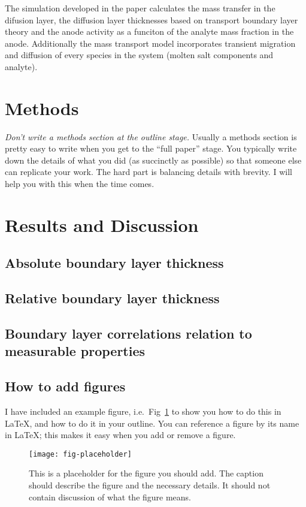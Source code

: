 \documentclass[journal=mamobx, layout=twocolumn]{achemso}
\begin{document}
The simulation developed in the paper calculates the mass transfer in the difusion layer, the diffusion layer thicknesses based on transport boundary layer theory and the anode activity as a funciton of the analyte mass fraction in the anode. 
Additionally the mass transport model incorporates transient migration and diffusion of every species in the system (molten salt components and analyte).


\section{Methods}
\emph{Don't write a methods section at the outline stage.}
Usually a methods section is pretty easy to write when you get to the ``full paper'' stage.
You typically write down the details of what you did (as succinctly as possible) so that someone else can replicate your work.
The hard part is balancing details with brevity.
I will help you with this when the time comes.


\section{Results and Discussion}

\subsection{Absolute boundary layer thickness}
\subsection{Relative boundary layer thickness}
\subsection{Boundary layer correlations relation to measurable properties}

\subsection{How to add figures}

I have included an example figure, i.e.\ Fig~\ref{fig-placeholder} to show you how to do this in LaTeX, and how to do it in your outline.
You can reference a figure by its name in LaTeX; this makes it easy when you add or remove a figure.

\begin{figure}[tbp]
  \texttt{[image: fig-placeholder]}
  \caption{This is a placeholder for the figure you should add. The caption should describe the figure and the necessary details.
It should not contain discussion of what the figure means.}
  \label{fig-placeholder}
\end{figure}
\end{document}
